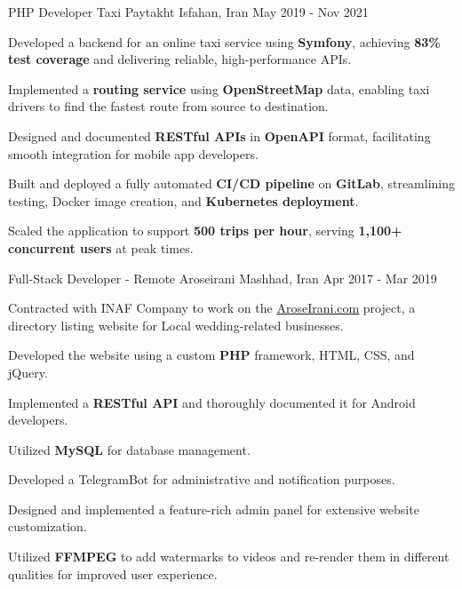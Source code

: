 \begin{cventries}
  \cventry
    {PHP Developer} %
    {Taxi Paytakht} %
    {Isfahan, Iran} %
    {May 2019  - Nov 2021} %
    {
      \begin{cvitems}
        \item {Developed a backend for an online taxi service using \textbf{Symfony}, achieving \textbf{83\% test coverage} and delivering reliable, high-performance APIs.}
        \item {Implemented a \textbf{routing service} using \textbf{OpenStreetMap} data, enabling taxi drivers to find the fastest route from source to destination.}
        \item {Designed and documented \textbf{RESTful APIs} in \textbf{OpenAPI} format, facilitating smooth integration for mobile app developers.}
        \item {Built and deployed a fully automated \textbf{CI/CD pipeline} on \textbf{GitLab}, streamlining testing, Docker image creation, and \textbf{Kubernetes deployment}.}
        \item {Scaled the application to support \textbf{500 trips per hour}, serving \textbf{1,100+ concurrent users} at peak times.}
      \end{cvitems}
    }
  
  \cventry
    {Full-Stack Developer - Remote} %
    {Aroseirani} %
    {Mashhad, Iran} %
    {Apr 2017 - Mar 2019} %
    {
      \begin{cvitems} %
        \item {Contracted with INAF Company to work on the \href{https://aroseirani.com}{\underline{AroseIrani.com}} project, a directory listing website for Local wedding-related businesses.}
        \item {Developed the website using a custom \textbf{PHP} framework, HTML, CSS, and jQuery.}
        \item {Implemented a \textbf{RESTful API} and thoroughly documented it for Android developers.}
        \item {Utilized \textbf{MySQL} for database management.}
        \item {Developed a TelegramBot for administrative and notification purposes.}
        \item {Designed and implemented a feature-rich admin panel for extensive website customization.}
        \item {Utilized \textbf{FFMPEG} to add watermarks to videos and re-render them in different qualities for improved user experience.}
      \end{cvitems}
    }


\end{cventries}
